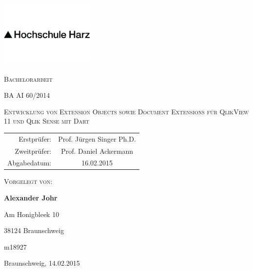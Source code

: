 

\pagestyle{empty}
\clearpage

\newcommand*{\titleUL}{\begingroup%
\begin{center}

\includegraphics[width=0.35\textwidth]{imgCom/logo.png}
 
\Huge{\textsc{Bachelorarbeit}}

\Large{\textsc{BA AI 60/2014}}

\vspace{0.8\baselineskip}

\huge{\textsc{Entwicklung von Extension Objects sowie Document Extensions für QlikView 11 und Qlik Sense mit Dart}}
\vspace{0.8\baselineskip}

\vfill



\normalsize

\begin{tabular}{r c}
Erstprüfer: &  Prof. Jürgen Singer Ph.D. \\
Zweitprüfer: &  Prof. Daniel Ackermann \\
Abgabedatum: & 16.02.2015\\
\end{tabular}



\vfill

\large{\textsc{Vorgelegt von:}}

\textbf{Alexander Johr}

Am Honigbleek 10

38124 Braunschweig

m18927


\vfill

Braunschweig, 14.02.2015

\end{center}

\endgroup}



\titleUL
